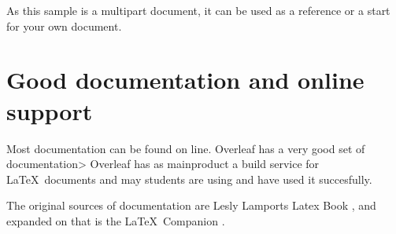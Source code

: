 As this sample is a multipart document, it can be used as a reference
or a start for your own document.


\section{Good documentation and online support}
Most documentation can be found on line. Overleaf has a very good set of documentation> Overleaf has as mainproduct a build service for \LaTeX\ documents and may students are using and have used it succesfully.

The original sources of documentation are Lesly Lamports Latex Book \textcite{latexbook}, and expanded on that is the \LaTeX\ Companion \parencite{latexcompanion}.



